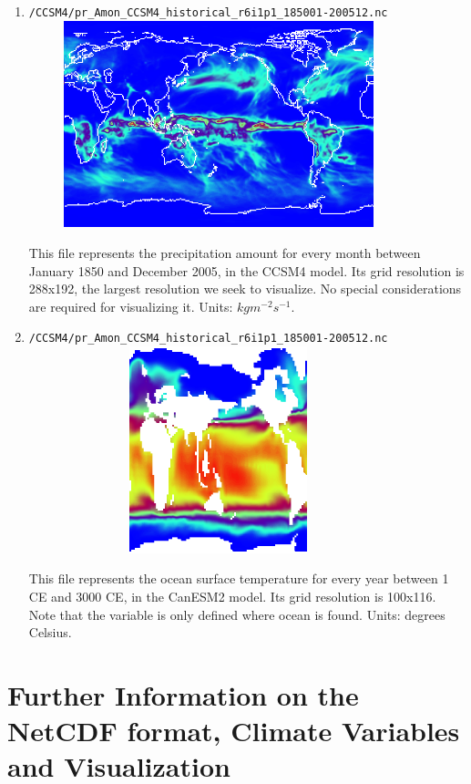 \documentclass{article}
\begin{document}
\begin{enumerate}
    \item \texttt{/CCSM4/pr\_Amon\_CCSM4\_historical\_r6i1p1\_185001-200512.nc} \\
    \includegraphics[width=11cm, height=6cm]{pr_amon_ccsm4_historical_r6i1p1_185001-200512}
    
    This file represents the precipitation amount for every month between January 1850 and December 2005, in the CCSM4 model. Its grid resolution is 288x192, the largest resolution we seek to visualize. No special considerations are required for visualizing it. Units: $kg m^{-2} s^{-1}$.
    
    \item \texttt{/CCSM4/pr\_Amon\_CCSM4\_historical\_r6i1p1\_185001-200512.nc} \\
    \includegraphics[width=11cm, height=6cm]{ss}
    
    This file represents the ocean surface temperature for every year between 1 CE and 3000 CE, in the CanESM2 model. Its grid resolution is 100x116. Note that the variable is only defined where ocean is found. Units: degrees Celsius.
          		
\end{enumerate}
\section{Further Information on the NetCDF format, Climate Variables and Visualization}
\end{document}
